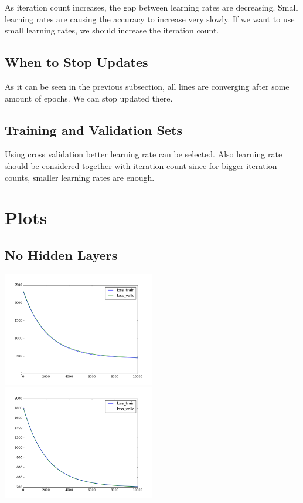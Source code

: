 \documentclass[conference]{IEEEtran}
\begin{document}
As iteration count increases, the gap between learning rates are decreasing. Small learning rates are causing the accuracy to increase very slowly. If we want to use small learning rates, we should increase the iteration count.

\subsection{When to Stop Updates}

As it can be seen in the previous subsection, all lines are converging after some amount of epochs. We can stop updated there.


\subsection{Training and Validation Sets}

Using cross validation better learning rate can be selected. Also learning rate should be considered together with iteration count since for bigger iteration counts, smaller learning rates are enough.


\section{Plots}

\subsection{No Hidden Layers}

\includegraphics[width=0.5\textwidth]{set1-[].png}
\includegraphics[width=0.5\textwidth]{set2-[].png}
\end{document}
